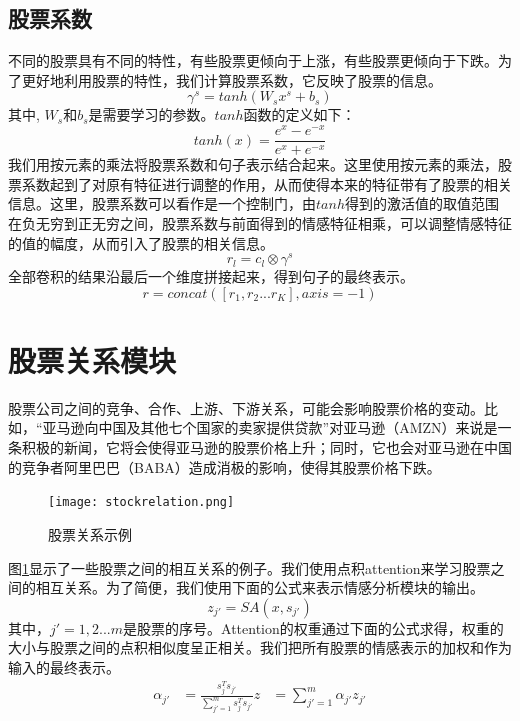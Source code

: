 \subsection{股票系数}
不同的股票具有不同的特性，有些股票更倾向于上涨，有些股票更倾向于下跌。为了更好地利用股票的特性，我们计算股票系数，它反映了股票的信息。
\begin{equation}
    \gamma ^ s = tanh(W_sx ^ s+b_s)
\end{equation}
其中, $W_s$和$b_s$是需要学习的参数。$tanh$函数的定义如下：
\begin{equation}
    tanh(x) =\frac{e ^ x-e ^ {-x}}{e ^ x+e ^ {-x}}
\end{equation}
我们用按元素的乘法将股票系数和句子表示结合起来。这里使用按元素的乘法，股票系数起到了对原有特征进行调整的作用，从而使得本来的特征带有了股票的相关信息。这里，股票系数可以看作是一个控制门，由$tanh$得到的激活值的取值范围在负无穷到正无穷之间，股票系数与前面得到的情感特征相乘，可以调整情感特征的值的幅度，从而引入了股票的相关信息。
\begin{equation}
    r_l = c_l\otimes \gamma ^ s
\end{equation}
全部卷积的结果沿最后一个维度拼接起来，得到句子的最终表示。
\begin{equation}
    r = concat([r_1, r_2...r_K],axis=-1)
\end{equation}
\section{股票关系模块}

股票公司之间的竞争、合作、上游、下游关系，可能会影响股票价格的变动。比如，“亚马逊向中国及其他七个国家的卖家提供贷款”对亚马逊（AMZN）来说是一条积极的新闻，它将会使得亚马逊的股票价格上升；同时，它也会对亚马逊在中国的竞争者阿里巴巴（BABA）造成消极的影响，使得其股票价格下跌。

\begin{figure}[H] %
	\centering
	\texttt{[image: stockrelation.png]}
	\caption{股票关系示例}
	\label{fig:stockrelationexample}
\end{figure}

图\ref{fig:stockrelationexample}显示了一些股票之间的相互关系的例子。我们使用点积attention来学习股票之间的相互关系。为了简便，我们使用下面的公式来表示情感分析模块的输出。
\begin{equation}
    z_{j'}=SA(x,s_{j'})
\end{equation}
其中，$j'=1, 2...m$是股票的序号。Attention的权重通过下面的公式求得，权重的大小与股票之间的点积相似度呈正相关。我们把所有股票的情感表示的加权和作为输入的最终表示。
\begin{equation}
    \begin{aligned}
        \alpha_{j'}&=\frac{s^T_{j}s_{j'}}{\sum_{j'=1}^{m}s^T_{j}s_{j'}}
        z &= \sum_{j'=1}^{m} \alpha_{j'}z_{j'}
    \end{aligned}
\end{equation}
